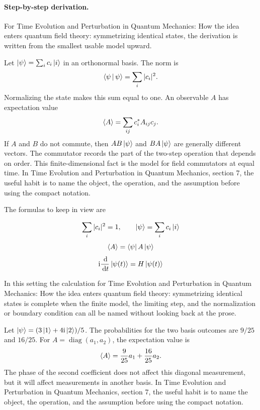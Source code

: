 \paragraph{Step-by-step derivation.}

For Time Evolution and Perturbation in Quantum Mechanics: How the idea enters quantum field theory: symmetrizing identical states, the derivation is written from the smallest usable model upward.

Let \(\left|\psi\right\rangle=\sum_i c_i\left|i\right\rangle\) in an orthonormal basis.  The norm is
\[
  \left\langle \psi\,\middle|\,\psi\right\rangle=\sum_i |c_i|^2.
\]
Normalizing the state makes this sum equal to one.  An observable \(A\) has expectation value
\[
  \left\langle A\right\rangle=\sum_{ij}c_i^*A_{ij}c_j.
\]
If \(A\) and \(B\) do not commute, then \(AB\left|\psi\right\rangle\) and \(BA\left|\psi\right\rangle\) are generally different vectors.  The commutator records the part of the two-step operation that depends on order.  This finite-dimensional fact is the model for field commutators at equal time.  In Time Evolution and Perturbation in Quantum Mechanics, section 7, the useful habit is to name the object, the operation, and the assumption before using the compact notation.

The formulas to keep in view are

\[
  \sum_i |c_i|^2=1,\qquad \left|\psi\right\rangle=\sum_i c_i\left|i\right\rangle
\]
\[
  \left\langle A\right\rangle=\left\langle \psi\right|A\left|\psi\right\rangle
\]
\[
  \mathrm i\frac{\,\mathrm d}{\,\mathrm d t}\left|\psi(t)\right\rangle=H\left|\psi(t)\right\rangle
\]

In this setting the calculation for Time Evolution and Perturbation in Quantum Mechanics: How the idea enters quantum field theory: symmetrizing identical states is complete when the finite model, the limiting step, and the normalization or boundary condition can all be named without looking back at the prose.




\begin{example}
Let \(\left|\psi\right\rangle=(3\left|1\right\rangle+4\mathrm i\left|2\right\rangle)/5\).  The probabilities for the two basis outcomes are \(9/25\) and \(16/25\).  For \(A=\operatorname{diag}(a_1,a_2)\), the expectation value is
\[
  \left\langle A\right\rangle=\frac{9}{25}a_1+\frac{16}{25}a_2.
\]
The phase of the second coefficient does not affect this diagonal measurement, but it will affect measurements in another basis.  In Time Evolution and Perturbation in Quantum Mechanics, section 7, the useful habit is to name the object, the operation, and the assumption before using the compact notation.
\end{example}



